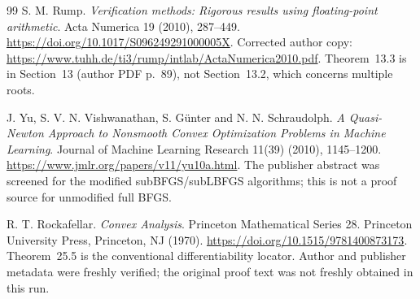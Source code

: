 \begin{thebibliography}{99}
S. M. Rump. \emph{Verification methods: Rigorous results using floating-point arithmetic}. Acta Numerica 19 (2010), 287--449. \url{https://doi.org/10.1017/S096249291000005X}. Corrected author copy: \url{https://www.tuhh.de/ti3/rump/intlab/ActaNumerica2010.pdf}. Theorem~13.3 is in Section~13 (author PDF p.~89), not Section~13.2, which concerns multiple roots.

J. Yu, S. V. N. Vishwanathan, S. G\"unter and N. N. Schraudolph. \emph{A Quasi-Newton Approach to Nonsmooth Convex Optimization Problems in Machine Learning}. Journal of Machine Learning Research 11(39) (2010), 1145--1200. \url{https://www.jmlr.org/papers/v11/yu10a.html}. The publisher abstract was screened for the modified subBFGS/subLBFGS algorithms; this is not a proof source for unmodified full BFGS.

R. T. Rockafellar. \emph{Convex Analysis}. Princeton Mathematical Series 28. Princeton University Press, Princeton, NJ (1970). \url{https://doi.org/10.1515/9781400873173}.
 Theorem~25.5 is the conventional differentiability locator. Author and publisher metadata were freshly verified; the original proof text was not freshly obtained in this run.

\end{thebibliography}
